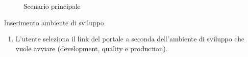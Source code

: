 \begin{figure}[h]
    \caption{Scenario principale}\label{fig:usecase-scenario-principale}
\end{figure}




\begin{usecase}{1}{Inserimento ambiente di sviluppo}\label{uc:inserimento-ambiente-di-sviluppo}

    \usecasemain{}
        \begin{enumerate}
            \item L'utente seleziona il link del portale a seconda dell'ambiente di sviluppo che vuole avviare (development, quality e production).
        \end{enumerate}

\end{usecase}

